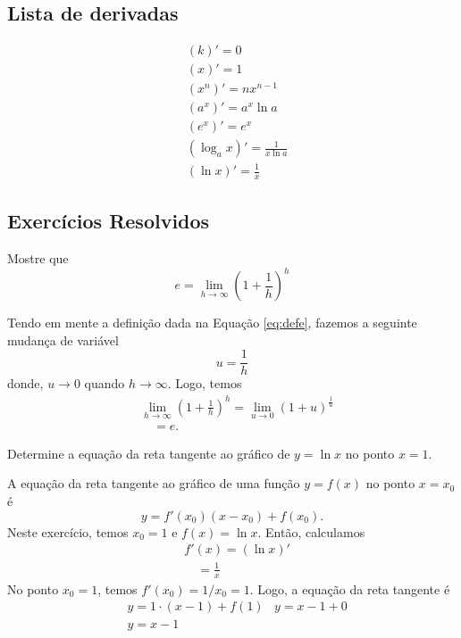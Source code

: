 \subsection{Lista de derivadas}

\begin{align}
  & (k)' = 0\\
  & (x)' = 1\\
  & (x^n)' = nx^{n-1}\\
  & (a^x)' = a^x\ln a\\
  & (e^x)' = e^x\\
  & (\log_a x)' = \frac{1}{x\ln a}\\
  & (\ln x)' = \frac{1}{x}
\end{align}


\subsection{Exercícios Resolvidos}

\begin{exeresol}
  Mostre que
  \begin{equation}
    e = \lim_{h\to\infty} \left(1 + \frac{1}{h}\right)^h
  \end{equation}
\end{exeresol}
\begin{resol}
  Tendo em mente a definição dada na Equação \ref{eq:defe}, fazemos a seguinte mudança de variável
  \begin{equation}
    u = \frac{1}{h}
  \end{equation}
  donde, $u\to 0$ quando $h\to \infty$. Logo, temos
  \begin{align}
    & \lim_{h\to\infty} \left(1 + \frac{1}{h}\right)^h = \lim_{u\to 0} \left(1 + u\right)^{\frac{1}{u}}\\
    & \text{}\quad = e.
  \end{align}
\end{resol}

\begin{exeresol}
  Determine a equação da reta tangente ao gráfico de $y = \ln x$ no ponto $x=1$.
\end{exeresol}
\begin{resol}
  A equação da reta tangente ao gráfico de uma função $y = f(x)$ no ponto $x=x_0$ é
  \begin{equation}
    y = f'(x_0)(x-x_0) + f(x_0).
  \end{equation}
  Neste exercício, temos $x_0=1$ e $f(x) =\ln x$. Então, calculamos
  \begin{align}
    & f'(x) = (\ln x)'\\
    & \text{}\quad = \frac{1}{x}
  \end{align}
  No ponto $x_0 = 1$, temos $f'(x_0) = 1/x_0 = 1$. Logo, a equação da reta tangente é
  \begin{align}
    & y = 1\cdot(x - 1) + f(1)
    & y = x - 1 + 0\\
    & y = x - 1
  \end{align}
\end{resol}

